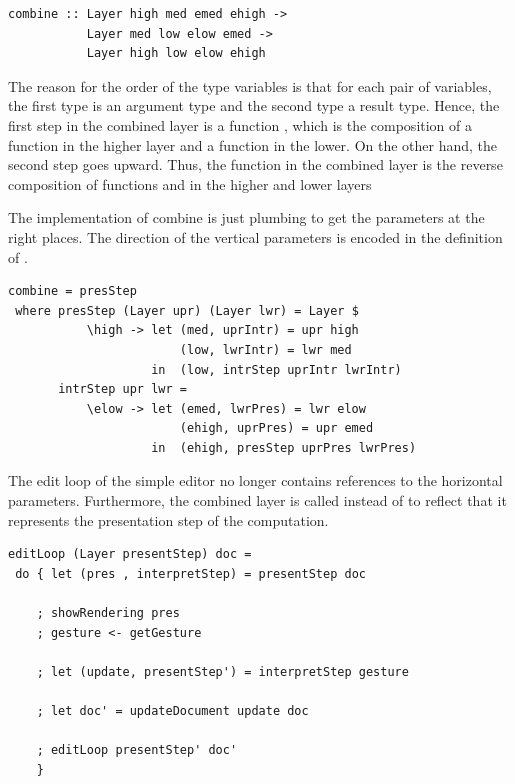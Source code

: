 \documentclass[preprint,natbib]{sigplanconf}
\begin{document}
\begin{small}
\begin{verbatim}
combine :: Layer high med emed ehigh -> 
           Layer med low elow emed -> 
           Layer high low elow ehigh
\end{verbatim}
\end{small}

The reason for the order of the type variables is that for each pair of variables, the first type is an argument type and the second type  a result type. Hence, the first step in the combined layer is a function , which is the composition of a function  in the higher layer and a function  in the lower. On the other hand, the second step goes upward.  Thus, the function  in the combined layer is the reverse composition of functions  and  in the higher and lower layers
  
The implementation of combine is just plumbing to get the parameters at the right places. The direction of the vertical parameters is encoded in the definition of . 


\begin{small}
\begin{verbatim}
combine = presStep
 where presStep (Layer upr) (Layer lwr) = Layer $ 
           \high -> let (med, uprIntr) = upr high
                        (low, lwrIntr) = lwr med
                    in  (low, intrStep uprIntr lwrIntr)
       intrStep upr lwr = 
           \elow -> let (emed, lwrPres) = lwr elow
                        (ehigh, uprPres) = upr emed
                    in  (ehigh, presStep uprPres lwrPres)
\end{verbatim}%
\end{small}



The edit loop of the simple editor no longer contains references to the horizontal parameters. Furthermore, the combined layer is called  instead of  to reflect that it represents the presentation step of the computation.

\begin{small}
\begin{verbatim}
editLoop (Layer presentStep) doc = 
 do { let (pres , interpretStep) = presentStep doc
    
    ; showRendering pres
    ; gesture <- getGesture
    
    ; let (update, presentStep') = interpretStep gesture
    
    ; let doc' = updateDocument update doc
    
    ; editLoop presentStep' doc'
    }
\end{verbatim}
\end{small}
\end{document}
